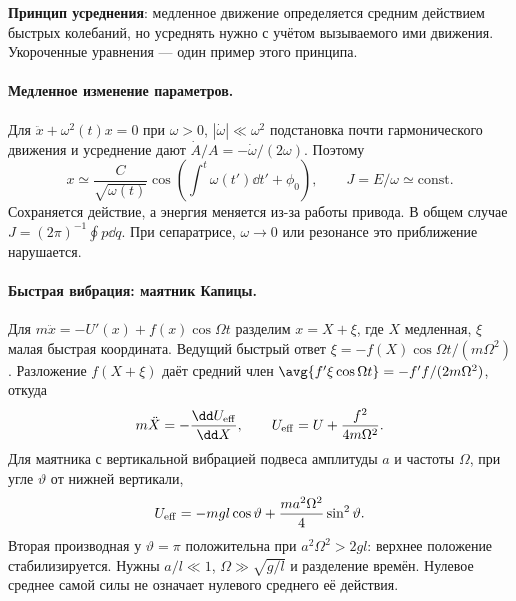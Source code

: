 \textbf{Принцип усреднения}: медленное движение определяется средним действием быстрых колебаний, но усреднять нужно с учётом вызываемого ими движения. Укороченные уравнения --- один пример этого принципа.

\paragraph{Медленное изменение параметров.}
Для $\ddot x+\omega^2(t)x=0$ при $\omega>0$, $|\dot\omega|\ll\omega^2$ подстановка почти гармонического движения и усреднение дают $\dot A/A=-\dot\omega/(2\omega)$. Поэтому
\begin{equation}
 x\simeq\frac C{\sqrt{\omega(t)}}\cos\left(\int^t\omega(t')\dd t'+\phi_0\right),
 \qquad J=E/\omega\simeq\mathrm{const}.
\end{equation}
Сохраняется действие, а энергия меняется из-за работы привода. В общем случае $J=(2\pi)^{-1}\oint p\dd q$. При сепаратрисе, $\omega\to0$ или резонансе это приближение нарушается.

\paragraph{Быстрая вибрация: маятник Капицы.}
Для $m\ddot x=-U'(x)+f(x)\cos\Omega t$ разделим $x=X+\xi$, где $X$ медленная, $\xi$ малая быстрая координата. Ведущий быстрый ответ $\xi=-f(X)\cos\Omega t/(m\Omega^2)$. Разложение $f(X+\xi)$ даёт средний член $\avg{f'\xi\cos\Omega t}=-f'f/(2m\Omega^2)$, откуда
\begin{equation}
 m\ddot X=-\frac{\dd U_{\rm eff}}{\dd X},\qquad
 U_{\rm eff}=U+\frac{f^2}{4m\Omega^2}.
\end{equation}
Для маятника с вертикальной вибрацией подвеса амплитуды $a$ и частоты $\Omega$, при угле $\vartheta$ от нижней вертикали,
\begin{equation}\label{eq:kapitza}
 U_{\rm eff}=-mgl\cos\vartheta+\frac{ma^2\Omega^2}{4}\sin^2\vartheta.
\end{equation}
Вторая производная у $\vartheta=\pi$ положительна при $a^2\Omega^2>2gl$: верхнее положение стабилизируется. Нужны $a/l\ll1$, $\Omega\gg\sqrt{g/l}$ и разделение времён. Нулевое среднее самой силы не означает нулевого среднего её действия.
